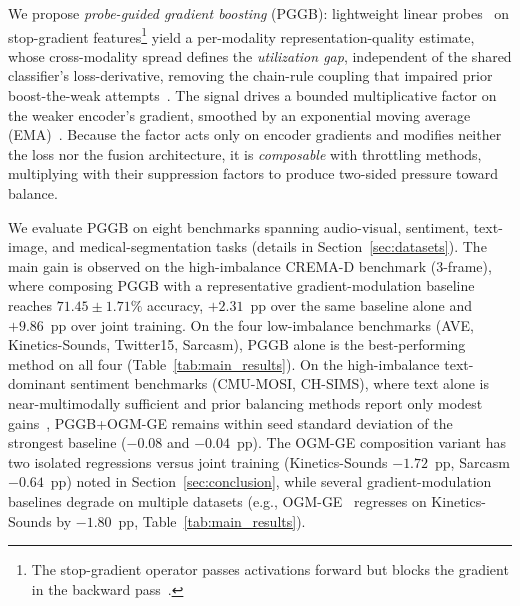 \documentclass{article}
\begin{document}
We propose \emph{probe-guided gradient boosting} (PGGB): lightweight linear probes~\citep{alain2017understanding} on stop-gradient features\footnote{The stop-gradient operator passes activations forward but blocks the gradient in the backward pass~\citep{vandenoord2017vqvae}.} yield a per-modality representation-quality estimate, whose cross-modality spread defines the \emph{utilization gap}, independent of the shared classifier's loss-derivative, removing the chain-rule coupling that impaired prior boost-the-weak attempts~\citep{wei2024opm}. The signal drives a bounded multiplicative factor on the weaker encoder's gradient, smoothed by an exponential moving average (EMA)~\citep{tarvainen2017mean}. Because the factor acts only on encoder gradients and modifies neither the loss nor the fusion architecture, it is \emph{composable} with throttling methods, multiplying with their suppression factors to produce two-sided pressure toward balance.


We evaluate PGGB on eight benchmarks spanning audio-visual, sentiment, text-image, and medical-segmentation tasks (details in Section~\ref{sec:datasets}). The main gain is observed on the high-imbalance CREMA-D benchmark (3-frame), where composing PGGB with a representative gradient-modulation baseline~\citep{peng2022ogmge} reaches $71.45 \pm 1.71\%$ accuracy, $+2.31$~pp over the same baseline alone and $+9.86$~pp over joint training. On the four low-imbalance benchmarks (AVE, Kinetics-Sounds, Twitter15, Sarcasm), PGGB alone is the best-performing method on all four (Table~\ref{tab:main_results}). On the high-imbalance text-dominant sentiment benchmarks (CMU-MOSI, CH-SIMS), where text alone is near-multimodally sufficient and prior balancing methods report only modest gains~\citep{liu2022chsimsv2,wei2025dgl}, PGGB+OGM-GE remains within seed standard deviation of the strongest baseline ($-0.08$ and $-0.04$~pp). The OGM-GE composition variant has two isolated regressions versus joint training (Kinetics-Sounds $-1.72$~pp, Sarcasm $-0.64$~pp) noted in Section~\ref{sec:conclusion}, while several gradient-modulation baselines degrade on multiple datasets (e.g., OGM-GE~\citep{peng2022ogmge} regresses on Kinetics-Sounds by $-1.80$~pp, Table~\ref{tab:main_results}).

\end{document}
